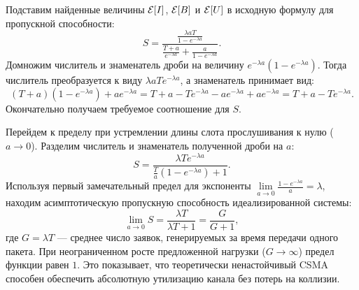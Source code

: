 \begin{sproof}
    Подставим найденные величины $\mathcal{E}[I]$, $\mathcal{E}[B]$ и $\mathcal{E}[U]$ в исходную формулу для пропускной способности:
    $$ S = \frac{\frac{\lambda a T}{1 - e^{-\lambda a}}}{\frac{T+a}{e^{-\lambda a}} + \frac{a}{1 - e^{-\lambda a}}}. $$
    Домножим числитель и знаменатель дроби на величину $e^{-\lambda a} (1 - e^{-\lambda a})$. Тогда числитель преобразуется к виду $\lambda a T e^{-\lambda a}$, а знаменатель принимает вид:
    $$ (T+a)(1 - e^{-\lambda a}) + a e^{-\lambda a} = T + a - T e^{-\lambda a} - a e^{-\lambda a} + a e^{-\lambda a} = T + a - T e^{-\lambda a}. $$
    Окончательно получаем требуемое соотношение для $S$.
\end{sproof}

\begin{conseq}
    Перейдем к пределу при устремлении длины слота прослушивания к нулю ($a \to 0$). Разделим числитель и знаменатель полученной дроби на $a$:
    $$ S = \frac{\lambda T e^{-\lambda a}}{\frac{T}{a}(1 - e^{-\lambda a}) + 1}. $$
    Используя первый замечательный предел для экспоненты $\lim\limits_{a \to 0} \frac{1 - e^{-\lambda a}}{a} = \lambda$, находим асимптотическую пропускную способность идеализированной системы:
    $$ \lim_{a \to 0} S = \frac{\lambda T}{\lambda T + 1} = \frac{G}{G + 1}, $$
    где $G = \lambda T$ — среднее число заявок, генерируемых за время передачи одного пакета. При неограниченном росте предложенной нагрузки ($G \to \infty$) предел функции равен $1$. Это показывает, что теоретически ненастойчивый CSMA способен обеспечить абсолютную утилизацию канала без потерь на коллизии.
\end{conseq}

\begin{center}
\end{center}

